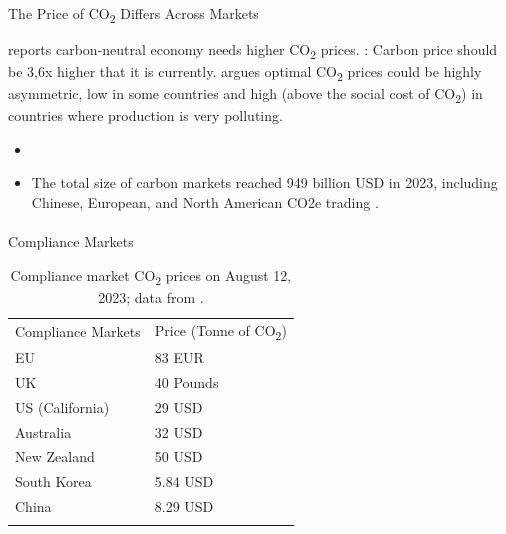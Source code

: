 \documentclass[
  letterpaper,
  DIV=11,
  numbers=noendperiod]{scrartcl}
\makeatletter
\let\oldparagraph\paragraph
\renewcommand{\paragraph}{
    \@ifstar
      \xxxParagraphStar
      \xxxParagraphNoStar
  }
\newcommand{\xxxParagraphStar}[1]{\oldparagraph*{#1}\mbox{}}
\newcommand{\xxxParagraphNoStar}[1]{\oldparagraph{#1}\mbox{}}
\providecommand{\tightlist}{%
  \setlength{\itemsep}{0pt}\setlength{\parskip}{0pt}}\usepackage{longtable,booktabs,array}
\makeatother
\begin{document}
\paragraph{\texorpdfstring{The Price of CO\textsubscript{2} Differs
Across
Markets}{The Price of CO2 Differs Across Markets}}\label{the-price-of-co2-differs-across-markets}

\citet{sternCarbonNeutralEconomy2022} reports carbon-neutral economy
needs higher CO\textsubscript{2} prices.
\citet{rennertComprehensiveEvidenceImplies2022}: Carbon price should be
3,6x higher that it is currently. \citet{ritzGlobalCarbonPrice2022}
argues optimal CO\textsubscript{2} prices could be highly asymmetric,
low in some countries and high (above the social cost of
CO\textsubscript{2}) in countries where production is very polluting.

\begin{itemize}
\tightlist
\item
  \citet{igeniusLetTalkSustainable2020}
\item
  The total size of carbon markets reached 949 billion USD in 2023,
  including Chinese, European, and North American CO2e trading
  \citep{lsegGlobalCarbonMarkets2024}.
\end{itemize}

\paragraph{Compliance Markets}\label{compliance-markets}

\begin{longtable}[]{@{}ll@{}}
\caption{Compliance market CO\textsubscript{2} prices on August 12,
2023; data from
\citep{emberCarbonPriceTracker2023, tradingeconomicsEUCarbonPermits2023, carboncreditsLiveCarbonPrices2023}.}\tabularnewline
\toprule\noalign{}
\endfirsthead
\endhead
\bottomrule\noalign{}
\endlastfoot
Compliance Markets & Price (Tonne of CO\textsubscript{2}) \\
EU & 83 EUR \\
UK & 40 Pounds \\
US (California) & 29 USD \\
Australia & 32 USD \\
New Zealand & 50 USD \\
South Korea & 5.84 USD \\
China & 8.29 USD \\
& \\
\end{longtable}
\end{document}
